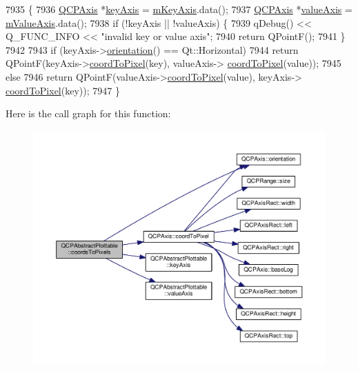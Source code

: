 \begin{DoxyCode}
7935                                                                        \{
7936   \hyperlink{class_q_c_p_axis}{QCPAxis} *\hyperlink{class_q_c_p_abstract_plottable_a72c7a09c22963f2c943f07112b311103}{keyAxis} = \hyperlink{class_q_c_p_abstract_plottable_a426f42e254d0f8ce5436a868c61a6827}{mKeyAxis}.data();
7937   \hyperlink{class_q_c_p_axis}{QCPAxis} *\hyperlink{class_q_c_p_abstract_plottable_a3106f9d34d330a6097a8ec5905e5b519}{valueAxis} = \hyperlink{class_q_c_p_abstract_plottable_a2901452ca4aea911a1827717934a4bda}{mValueAxis}.data();
7938   \textcolor{keywordflow}{if} (!keyAxis || !valueAxis) \{
7939     qDebug() << Q\_FUNC\_INFO << \textcolor{stringliteral}{"invalid key or value axis"};
7940     \textcolor{keywordflow}{return} QPointF();
7941   \}
7942 
7943   \textcolor{keywordflow}{if} (keyAxis->\hyperlink{class_q_c_p_axis_a57483f2f60145ddc9e63f3af53959265}{orientation}() == Qt::Horizontal)
7944     \textcolor{keywordflow}{return} QPointF(keyAxis->\hyperlink{class_q_c_p_axis_a985ae693b842fb0422b4390fe36d299a}{coordToPixel}(key), valueAxis->
      \hyperlink{class_q_c_p_axis_a985ae693b842fb0422b4390fe36d299a}{coordToPixel}(value));
7945   \textcolor{keywordflow}{else}
7946     \textcolor{keywordflow}{return} QPointF(valueAxis->\hyperlink{class_q_c_p_axis_a985ae693b842fb0422b4390fe36d299a}{coordToPixel}(value), keyAxis->
      \hyperlink{class_q_c_p_axis_a985ae693b842fb0422b4390fe36d299a}{coordToPixel}(key));
7947 \}
\end{DoxyCode}


Here is the call graph for this function\+:\nopagebreak
\begin{figure}[H]
\begin{center}
\leavevmode
\includegraphics[width=350pt]{class_q_c_p_abstract_plottable_a9fd1c9df8391781f05b0be22fbe91e13_cgraph}
\end{center}
\end{figure}


